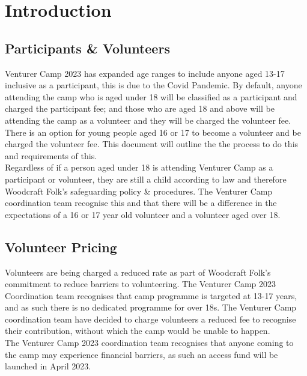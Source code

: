 \documentclass[a4paper, 11pt]{article}
\begin{document}
\section{Introduction}
\subsection{Participants \& Volunteers}
Venturer Camp 2023 has expanded age ranges to include anyone aged 13-17 inclusive as a participant, this is due to the Covid Pandemic. By default, anyone attending the camp who is aged under 18 will be classified as a participant and charged the participant fee; and those who are aged 18 and above will be attending the camp as a volunteer and they will be charged the volunteer fee.\\

There is an option for young people aged 16 or 17 to become a volunteer and be charged the volunteer fee. This document will outline the the process to do this and requirements of this.\\

Regardless of if a person aged under 18 is attending Venturer Camp as a participant or volunteer, they are still a child according to law and therefore Woodcraft Folk's safeguarding policy \& procedures. The Venturer Camp coordination team recognise this and that there will be a difference in the expectations of a 16 or 17 year old volunteer and a volunteer aged over 18. 

\subsection{Volunteer Pricing}
Volunteers are being charged a reduced rate as part of Woodcraft Folk's commitment to reduce barriers to volunteering. The Venturer Camp 2023 Coordination team recognises that camp programme is targeted at 13-17 years, and as such there is no dedicated programme for over 18s. The Venturer Camp coordination team have decided to charge volunteers a reduced fee to recognise their contribution, without which the camp would be unable to happen.\\

The Venturer Camp 2023 coordination team recognises that anyone coming to the camp may experience financial barriers, as such an access fund will be launched in April 2023. 
\end{document}
